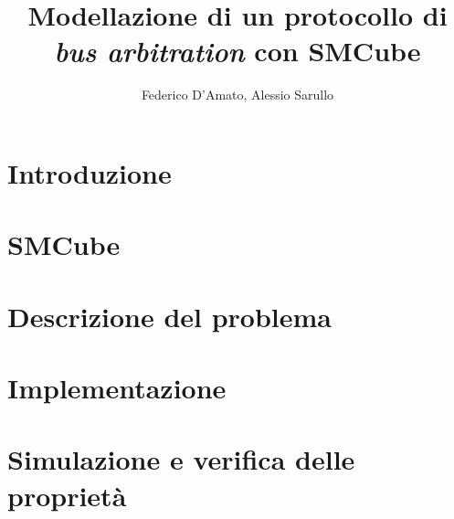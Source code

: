 \documentclass{article}
\title{Modellazione di un protocollo di \textit{bus arbitration} con SMCube}
\author{Federico D'Amato, Alessio Sarullo}
\begin{document}
\date{}
\maketitle


\section{Introduzione}

\section{SMCube}

\section{Descrizione del problema}
\label{Sec:problem}

\section{Implementazione}

\section{Simulazione e verifica delle proprietà}




\nocite{*}		 %
{}

\end{document}
